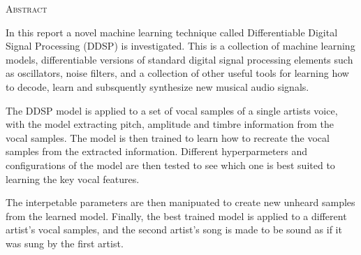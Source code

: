 \begin{center}
  \textsc{Abstract}
\end{center}
%
\noindent
%
In this report a novel machine learning technique called Differentiable Digital Signal Processing (DDSP) is investigated. This is a collection of machine learning models, differentiable versions of standard digital signal processing elements such as oscillators, noise filters, and a collection of other useful tools for learning how to decode, learn and subsquently synthesize new musical audio signals.

The DDSP model is applied to a set of vocal samples of a single artists voice, with the model extracting pitch, amplitude and timbre information from the vocal samples. The model is then trained to learn how to recreate the vocal samples from the extracted information. Different hyperparmeters and configurations of the model are then tested to see which one is best suited to learning the key vocal features.

The interpetable parameters are then manipuated to create new unheard samples from the learned model. Finally, the best trained model is applied to a different artist's vocal samples, and the second artist's song is made to be sound as if it was sung by the first artist.